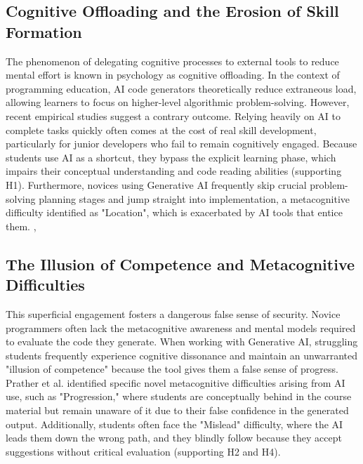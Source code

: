 \documentclass[../tanulmany.tex]{subfiles}
\begin{document}
\subsection{Cognitive Offloading and the Erosion of Skill Formation}
The phenomenon of delegating cognitive processes to external tools to reduce mental effort is known in psychology as cognitive offloading. In the context of programming education, AI code generators theoretically reduce extraneous load, allowing learners to focus on higher-level algorithmic problem-solving. However, recent empirical studies suggest a contrary outcome. Relying heavily on AI to complete tasks quickly often comes at the cost of real skill development, particularly for junior developers who fail to remain cognitively engaged.
Because students use AI as a shortcut, they bypass the explicit learning phase, which impairs their conceptual understanding and code reading abilities (supporting H1).
Furthermore, novices using Generative AI frequently skip crucial problem-solving planning stages and jump straight into implementation, a metacognitive difficulty identified as "Location",
which is exacerbated by AI tools that entice them.
\cite{shen2026how}, \cite{prather2024widening}

\subsection{The Illusion of Competence and Metacognitive Difficulties}
This superficial engagement fosters a dangerous false sense of security. Novice programmers often lack the metacognitive awareness and mental models required to evaluate the code they generate.
When working with Generative AI, struggling students frequently experience cognitive dissonance and maintain an unwarranted "illusion of competence" because the tool gives them a false sense of progress.
Prather et al. identified specific novel metacognitive difficulties arising from AI use, such as "Progression," where students are conceptually behind in the course material but remain unaware of it due to their false confidence in the generated output.
Additionally, students often face the "Mislead" difficulty, where the AI leads them down the wrong path, and they blindly follow because they accept suggestions without critical evaluation (supporting H2 and H4).
\cite{prather2024widening}
\end{document}
